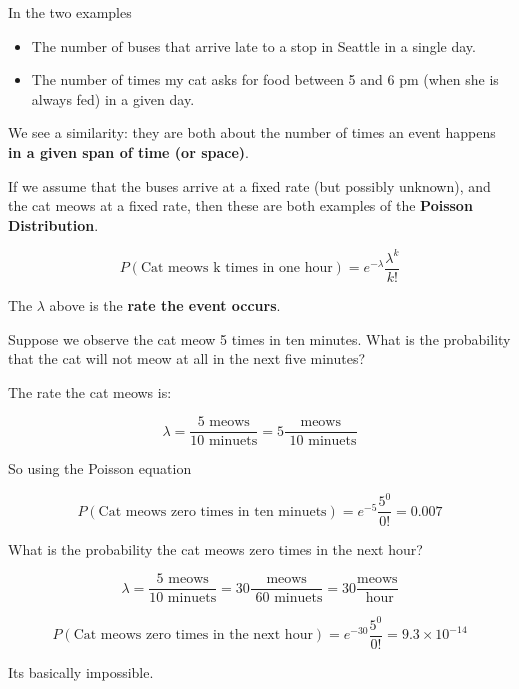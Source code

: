%
\begin{frame}

In the two examples

\begin{itemize}
\item The number of buses that arrive late to a stop in Seattle in a single
day.
\item The number of times my cat asks for food between 5 and 6 pm (when she is
always fed) in a given day.
\end{itemize}

We see a similarity: they are both about the number of times an event happens
\textbf{in a given span of time (or space)}.
\end{frame}
%

%
\begin{frame}
If we assume that the buses arrive at a fixed rate (but possibly unknown), and
the cat meows at a fixed rate, then these are both examples of the
\textbf{Poisson Distribution}.

$$ P(\text{Cat meows k times in one hour}) = e^{-\lambda} \frac{\lambda^k}{k!}
$$

The $\lambda$ above is the \textbf{rate the event occurs}.
\end{frame}
%

%
\begin{frame}
Suppose we observe the cat meow 5 times in ten minutes.  What is the probability
that the cat will not meow at all in the next five minutes?
\end{frame}
%

%
\begin{frame}
The rate the cat meows is:

$$ \lambda = \frac{5 \text{ meows}}{10 \text{ minuets}} = 5 \frac{ \text{
meows}}{\text{ 10 minuets}} $$

So using the Poisson equation

$$ P(\text{Cat meows zero times in ten minuets}) = e^{-5} \frac{5^0}{0!} = 0.007
$$
\end{frame}
%

%
\begin{frame}
What is the probability the cat meows zero times in the next hour?

$$ 
\lambda = \frac{5 \text{ meows}}{10 \text{ minuets}} = 30 \frac{ \text{
meows}}{\text{ 60 minuets}} = 30 \frac{ \text{
meows}}{\text{ hour}}
$$

$$ P(\text{Cat meows zero times in the next hour}) = e^{-30} \frac{5^0}{0!} =
9.3 \times 10^{-14}
$$

Its basically impossible.
\end{frame}
%

